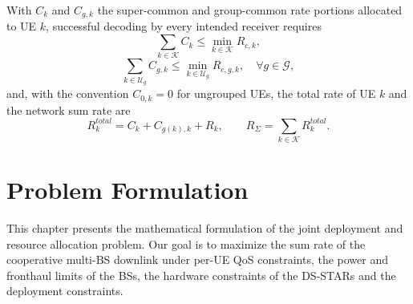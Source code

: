 With $C_k$ and $C_{g,k}$ the super-common and group-common rate portions allocated to UE $k$, successful decoding by every intended receiver requires
\begin{equation} \label{eq:c-supalloc}
\sum_{k \in \mathcal{K}} C_k \le \min_{k \in \mathcal{K}} R_{c,k},
\end{equation}
\begin{equation} \label{eq:c-grpalloc}
\sum_{k \in \mathcal{U}_g} C_{g,k} \le \min_{k \in \mathcal{U}_g} R_{c,g,k}, \quad \forall g \in \mathcal{G},
\end{equation}
and, with the convention $C_{0,k} = 0$ for ungrouped UEs, the total rate of UE $k$ and the network sum rate are
\begin{equation} \label{eq:Rk_total}
R_k^{total} = C_k + C_{g(k),k} + R_k, \qquad R_\Sigma = \sum_{k\in\mathcal{K}}R_k^{total}.
\end{equation}

\chapter{Problem Formulation}\label{sec:problem}
This chapter presents the mathematical formulation of the joint deployment and resource allocation problem. Our goal is to maximize the sum rate of the cooperative multi-BS downlink under per-UE QoS constraints, the power and fronthaul limits of the BSs, the hardware constraints of the DS-STARs and the deployment constraints.

